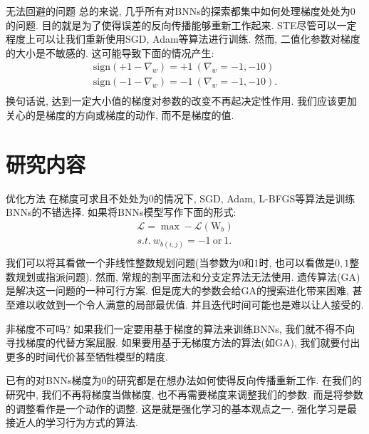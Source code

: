 \documentclass{beamer}
\begin{document}
\begin{frame}{无法回避的问题}
    \footnotesize
    总的来说, 几乎所有对BNNs的探索都集中如何处理梯度处处为$0$的问题. 目的就是为了使得误差的反向传播能够重新工作起来. STE尽管可以一定程度上可以让我们重新使用SGD, Adam等算法进行训练. 然而, 二值化参数对梯度的大小是不敏感的. 这可能导致下面的情况产生:
    \begin{equation}
        \begin{matrix}
            \mathrm{sign}(+1-\nabla _w)=+1~(\nabla _w=-1,-10)\\
            \mathrm{sign}(-1-\nabla _w)=-1~(\nabla _w=-1,-10).\\
        \end{matrix}
    \end{equation} 
    换句话说, 达到一定大小值的梯度对参数的改变不再起决定性作用. 我们应该更加关心的是梯度的方向或梯度的动作, 而不是梯度的值.
\end{frame}

\section{研究内容}

\begin{frame}{优化方法}
    \footnotesize
    在梯度可求且不处处为$0$的情况下, SGD, Adam, L-BFGS等算法是训练BNNs的不错选择. 如果将BNNs模型写作下面的形式:
    \begin{equation}
        \begin{matrix}
            \mathcal{L} =\max -\mathcal{L} \left( \mathrm{W}_b \right)\\
            s.t.~w_{b\left( i,j \right)}=-1~\mathrm{or}~1.\\
        \end{matrix}
    \end{equation}
    我们可以将其看做一个非线性整数规划问题(当参数为$0$和$1$时, 也可以看做是$0,1$整数规划或指派问题). 然而, 常规的割平面法和分支定界法无法使用. 遗传算法(GA)是解决这一问题的一种可行方案. 但是庞大的参数会给GA的搜索进化带来困难, 甚至难以收敛到一个令人满意的局部最优值. 并且迭代时间可能也是难以让人接受的. 
\end{frame}

\begin{frame}{非梯度不可吗?}
    \footnotesize
    如果我们一定要用基于梯度的算法来训练BNNs, 我们就不得不向寻找梯度的代替方案屈服. 如果要用基于无梯度方法的算法(如GA), 我们就要付出更多的时间代价甚至牺牲模型的精度. 
    
    已有的对BNNs梯度为$0$的研究都是在想办法如何使得反向传播重新工作. 在我们的研究中, 我们不再将梯度当做梯度, 也不再需要梯度来调整我们的参数. 而是将参数的调整看作是一个动作的调整. 这是就是强化学习的基本观点之一. 强化学习是最接近人的学习行为方式的算法.
\end{frame}
\end{document}
